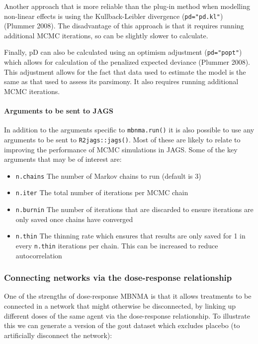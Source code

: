 \documentclass[]{article}
\providecommand{\tightlist}{%
  \setlength{\itemsep}{0pt}\setlength{\parskip}{0pt}}
\let\oldparagraph\paragraph
\renewcommand{\paragraph}[1]{\oldparagraph{#1}\mbox{}}
\begin{document}
Another approach that is more reliable than the plug-in method when
modelling non-linear effects is using the Kullback-Leibler divergence
(\texttt{pd="pd.kl"}) (Plummer 2008). The disadvantage of this approach
is that it requires running additional MCMC iterations, so can be
slightly slower to calculate.

Finally, pD can also be calculated using an optimism adjustment
(\texttt{pd="popt"}) which allows for calculation of the penalized
expected deviance (Plummer 2008). This adjustment allows for the fact
that data used to estimate the model is the same as that used to assess
its parsimony. It also requires running additional MCMC iterations.

\hypertarget{arguments-to-be-sent-to-jags}{%
\paragraph{Arguments to be sent to
JAGS}\label{arguments-to-be-sent-to-jags}}

In addition to the arguments specific to \texttt{mbnma.run()} it is also
possible to use any arguments to be sent to \texttt{R2jags::jags()}.
Most of these are likely to relate to improving the performance of MCMC
simulations in JAGS. Some of the key arguments that may be of interest
are:

\begin{itemize}
\tightlist
\item
  \texttt{n.chains} The number of Markov chains to run (default is 3)
\item
  \texttt{n.iter} The total number of iterations per MCMC chain
\item
  \texttt{n.burnin} The number of iterations that are discarded to
  ensure iterations are only saved once chains have converged
\item
  \texttt{n.thin} The thinning rate which ensures that results are only
  saved for 1 in every \texttt{n.thin} iterations per chain. This can be
  increased to reduce autocorrelation
\end{itemize}

\hypertarget{connecting-networks-via-the-dose-response-relationship}{%
\subsubsection{Connecting networks via the dose-response
relationship}\label{connecting-networks-via-the-dose-response-relationship}}

One of the strengths of dose-response MBNMA is that it allows treatments
to be connected in a network that might otherwise be disconnected, by
linking up different doses of the same agent via the dose-response
relationship. To illustrate this we can generate a version of the gout
dataset which excludes placebo (to artificially disconnect the network):
\end{document}

